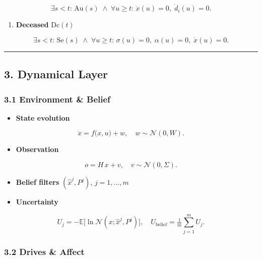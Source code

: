 \documentclass[
]{article}
\providecommand{\tightlist}{%
  \setlength{\itemsep}{0pt}\setlength{\parskip}{0pt}}
\begin{document}
\[ \exists s<t:\,\mathrm{Au}(s) \;\land\; \forall u\ge t:\,\dot x(u)=0,\;\dot d_i(u)=0. \]

\begin{enumerate}
\def\labelenumi{\arabic{enumi}.}
\setcounter{enumi}{8}
\tightlist
\item
  \textbf{Deceased} \(\mathrm{Dc}(t)\)
\end{enumerate}

\[ \exists s<t:\,\mathrm{Se}(s) \;\land\; \forall u\ge t:\,\sigma(u)=0,\;\alpha(u)=0,\;\dot x(u)=0. \]

\begin{center}\rule{0.5\linewidth}{0.5pt}\end{center}

\hypertarget{3-dynamical-layer}{%
\subsection{3. Dynamical Layer}\label{3-dynamical-layer}}

\hypertarget{31-environment--belief}{%
\subsubsection{3.1 Environment \& Belief}\label{31-environment--belief}}

\begin{itemize}
\tightlist
\item
  \textbf{State evolution}
\end{itemize}

\[ \dot x = f\bigl(x,u\bigr) + w,\quad w\sim\mathcal N(0,W). \]

\begin{itemize}
\tightlist
\item
  \textbf{Observation}
\end{itemize}

\[ o = H\,x + v,\quad v\sim\mathcal N(0,\Sigma). \]

\begin{itemize}
\item
  \textbf{Belief filters} \((\hat x^j,P^j)\), \(j=1,\dots,m\)
\item
  \textbf{Uncertainty}
\end{itemize}

\[ U_j = -\mathbb E\bigl[\ln\mathcal N(x;\hat x^j,P^j)\bigr],\quad U_{\mathrm{belief}}=\tfrac1m\sum_{j=1}^m U_j. \]

\hypertarget{32-drives--affect}{%
\subsubsection{3.2 Drives \& Affect}\label{32-drives--affect}}
\end{document}

